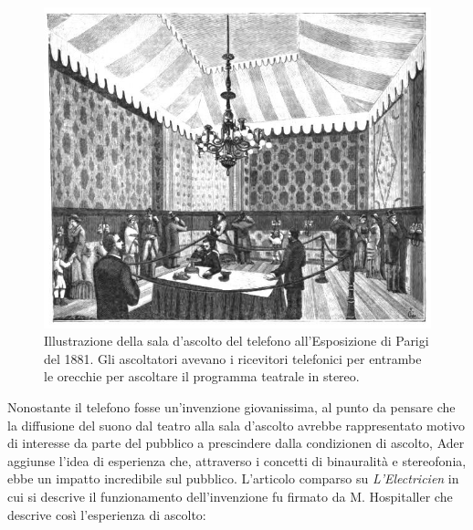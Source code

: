\begin{figure}[t]
\centering
\includegraphics[width=1\columnwidth]{CAPITOLI/1000/IMG/1881opr4.jpg}
\caption{Illustrazione della sala d'ascolto del telefono all'Esposizione di
Parigi del 1881. Gli ascoltatori avevano i ricevitori telefonici per entrambe
le orecchie per ascoltare il programma teatrale in stereo.}
\label{fig:teatrophone2}
\end{figure}

Nonostante il telefono fosse un'invenzione giovanissima, al punto da pensare che
la diffusione del suono dal teatro alla sala d'ascolto avrebbe rappresentato
motivo di interesse da parte del pubblico a prescindere dalla condizionen di
ascolto, Ader aggiunse l'idea di esperienza che, attraverso i concetti di
binauralità e stereofonia, ebbe un impatto incredibile sul pubblico. L'articolo
comparso su \emph{L'Electricien} in cui si descrive il funzionamento
dell'invenzione fu firmato da M. Hospitaller che descrive così l'esperienza di
ascolto:

